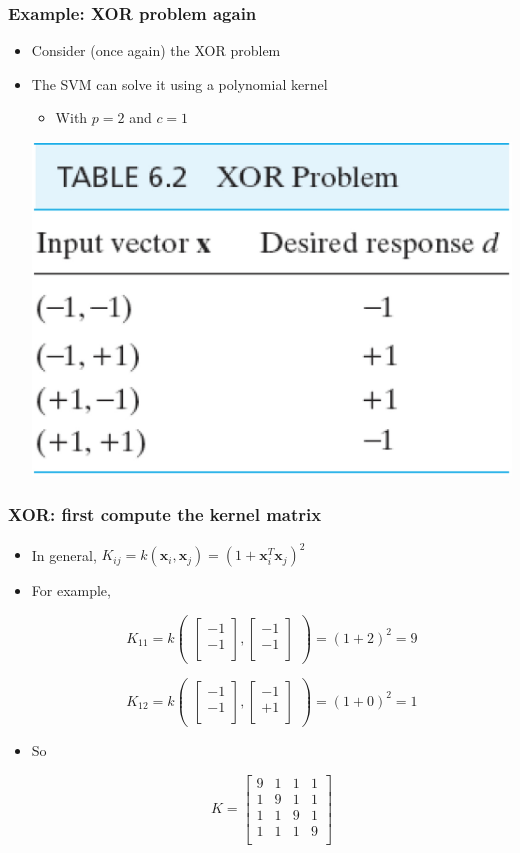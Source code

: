 \documentclass[12pt,notes,mathserif]{beamer}
\begin{document}
\begin{frame}[c]
\frametitle{Example: XOR problem again}
\begin{itemize}
\item Consider (once again) the XOR problem
\item The SVM can solve it using a polynomial kernel
\begin{itemize}
\item With $p=2$ and $c=1$
\end{itemize}
\begin{center}
\includegraphics[width=0.5\linewidth]{fig10/lec1012.jpg}
\end{center}
\end{itemize}
\end{frame}


\begin{frame}[c]
\frametitle{XOR: first compute the kernel matrix}
\begin{itemize}
\item In general, $K_{ij}=k(\mathbf{x}_i,\mathbf{x}_j)=(1+\mathbf{x}_i^T\mathbf{x}_j)^2$
\item For example,

\[K_{11}=k
\begin{pmatrix}
\begin{bmatrix}
-1\\
-1\\
\end{bmatrix},\begin{bmatrix}
-1\\
-1\\
\end{bmatrix}
\end{pmatrix}=(1+2)^2=9
\]

\[K_{12}=k
\begin{pmatrix}
\begin{bmatrix}
-1\\
-1\\
\end{bmatrix},\begin{bmatrix}
-1\\
+1\\
\end{bmatrix}
\end{pmatrix}=(1+0)^2=1
\]
\item So

\[
K=
\begin{bmatrix}
9&1&1&1\\
1&9&1&1\\
1&1&9&1\\
1&1&1&9\\
\end{bmatrix}
\]
\end{itemize}
\end{frame}
\end{document}
